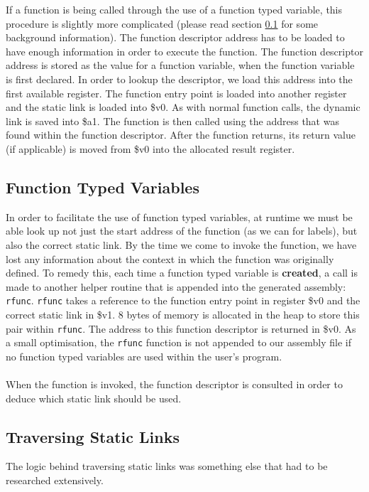 \begin{description}
	If a function is being called through the use of a function typed variable, this procedure is slightly more complicated (please read section \ref{sec:ftv} for some background information). The function descriptor address has to be loaded to have enough information in order to execute the function. The function descriptor address is stored as the value for a function variable, when the function variable is first declared. In order to lookup the descriptor, we load this address into the first available register. The function entry point is loaded into another register and the static link is loaded into \$v0. As with normal function calls, the dynamic link is saved into \$a1. The function is then called using the address that was found within the function descriptor. After the function returns, its return value (if applicable) is moved from \$v0 into the allocated result register.
\end{description}

\subsection{Function Typed Variables}
\label{sec:ftv}
In order to facilitate the use of function typed variables, at runtime we must be able look up not just the start address of the function (as we can for labels), but also the correct static link. By the time we come to invoke the function, we have lost any information about the context in which the function was originally defined. To remedy this, each time a function typed variable is \textbf{created}, a call is made to another helper routine that is appended into the generated assembly: \verb!rfunc!. \verb!rfunc! takes a reference to the function entry point in register \$v0 and the correct static link in \$v1. 8 bytes of memory is allocated in the heap to store this pair within \verb!rfunc!. The address to this function descriptor is returned in \$v0. As a small optimisation, the \verb!rfunc! function is not appended to our assembly file if no function typed variables are used within the user's program.
\ \\ \ \\
When the function is invoked, the function descriptor is consulted in order to deduce which static link should be used.


\subsection{Traversing Static Links}
\label{sec:staticlinks}
The logic behind traversing static links was something else that had to be researched extensively. 

